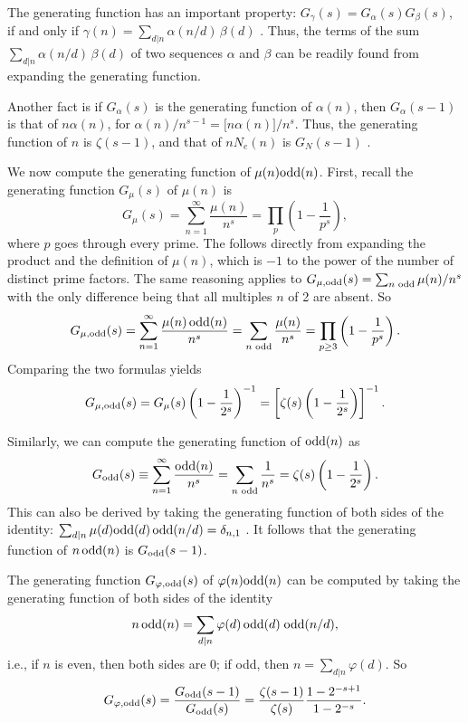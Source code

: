 \documentclass[twocolumn]{revtex4-1}
\begin{document}
The generating function has an important property:
$G_\gamma(s) = G_\alpha(s) G_\beta(s)$,
if and only if $\gamma(n) = \sum_{d|n} \alpha(n/d)\, \beta(d)$ \cite{hardy}.
Thus,
  the terms of the sum $\sum_{d|n} \alpha(n/d)\, \beta(d)$
  of two sequences $\alpha$ and $\beta$
  can be readily found from expanding the generating function.



Another fact is if $G_\alpha(s)$ is the generating function of $\alpha(n)$,
then $G_\alpha(s-1)$ is that of $n \alpha(n)$,
for $\alpha(n)/n^{s-1} = \big[ n \alpha(n) \big] / n^s$.
Thus, the generating function of $n$ is $\zeta(s-1)$,
and
that of $n N_e(n)$ is $G_N(s-1)$
.



We now compute the generating function of $\mu(n)\mathrm{odd}(n)$.
First, recall the generating function $G_\mu(s)$ of $\mu(n)$ is
\[
  G_\mu(s) = \sum_{n=1}^{\infty} \frac{\mu(n)}{n^s}
  = \prod_p \left( 1 - \frac{1}{p^s} \right),
\]
where $p$ goes through every prime.
%
The follows directly from expanding the product
  and the definition of $\mu(n)$,
which is $-1$ to the power of the number of distinct prime factors.
%
The same reasoning applies to
$G_{\mu, \mathrm{odd}}(s) = \sum_{n \text{ odd}} \mu(n)/n^s$
with the only difference being that all multiples $n$ of 2
are absent. So
%
\footnotesize
\[
  G_{\mu, \mathrm{odd}}(s)
  = \sum_{n=1}^{\infty} \frac{\mu(n) \, \mathrm{odd}(n)}{n^s}
  = \sum_{n \text{ odd}} \frac{\mu(n)}{n^s}
  = \prod_{p \ge 3} \left( 1 - \frac{1}{p^s} \right).
\]
\normalsize
Comparing the two formulas yields
\[
  G_{\mu, \mathrm{odd}}(s)
  = G_{\mu}(s)
  \left(1- \frac{1}{2^s}\right)^{-1}
  =
   \left[ \zeta(s) \left(1- \frac{1}{2^s}\right) \right]^{-1}.
\]



Similarly,
we can compute the generating function of $\mathrm{odd}(n)$ as
\[
  G_{\mathrm{odd}}(s)
  \equiv \sum_{n=1}^{\infty} \frac{\mathrm{odd}(n)}{n^s}
  = \sum_{n \text{ odd}} \frac{1}{n^s}
  = \zeta(s) \left(1 - \frac{1}{2^s} \right).
\]
This can also be derived by taking the generating function of
both sides of the identity:
$\sum_{d|n} \mu(d) \mathrm{odd}(d) \, \mathrm{odd}(n/d) = \delta_{n, 1}$
\big[which is a modification of
$\sum_{d|n} \mu(d) = \delta_{n, 1}$\big].
%
It follows that the generating function of $n \, \mathrm{odd}(n)$ is $G_{\mathrm{odd}}(s-1)$.



The generating function $G_{\varphi,\mathrm{odd}}(s)$
of $\varphi(n) \mathrm{odd}(n)$ can be computed by taking the generating function
of both sides of the identity
\[
  n \, \mathrm{odd}(n)  = \sum_{d|n} \varphi(d) \, \mathrm{odd}(d) \; \mathrm{odd}(n/d),
\]
i.e., if $n$ is even, then both sides are 0;
if odd, then $n = \sum_{d|n} \varphi(d)$.
So
\[
  G_{\varphi,\mathrm{odd}}(s) = \frac{G_{\mathrm{odd}}(s-1)}{G_{\mathrm{odd}}(s)}
  = \frac{\zeta(s-1)}{\zeta(s)} \frac{1 - 2^{-s + 1}}{1 - 2^{-s}}.
\]
\end{document}
